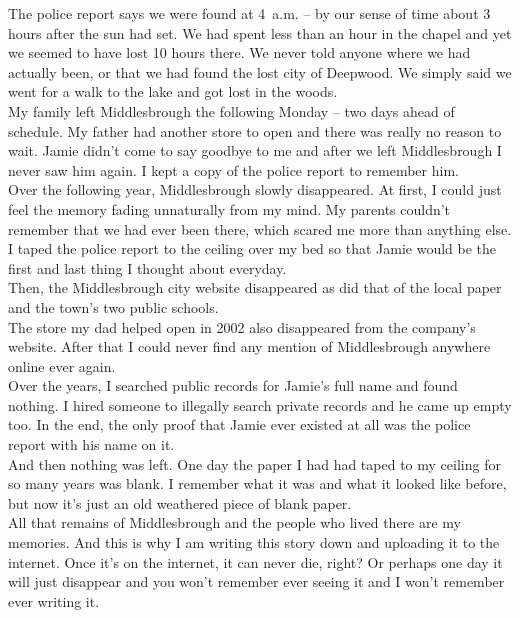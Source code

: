 \documentclass[a5paper]{scrartcl}
\begin{document}
The police report says we were found at 4~a.m. – by our sense of time about 3 hours after the sun had set. We had spent less than an hour in the chapel and yet we seemed to have lost 10 hours there. We never told anyone where we had actually been, or that we had found the lost city of Deepwood. We simply said we went for a walk to the lake and got lost in the woods. \\


My family left Middlesbrough the following Monday – two days ahead of schedule. My father had another store to open and there was really no reason to wait. Jamie didn't come to say goodbye to me and after we left Middlesbrough I never saw him again. I kept a copy of the police report to remember him.\\


Over the following year, Middlesbrough slowly disappeared. At first, I could just feel the memory fading unnaturally from my mind. My parents couldn't remember that we had ever been there, which scared me more than anything else. I taped the police report to the ceiling over my bed so that Jamie would be the first and last thing I thought about everyday.  \\


Then, the Middlesbrough city website disappeared as did that of the local paper and the town's two public schools.\\


The store my dad helped open in 2002 also disappeared from the company's website. After that I could never find any mention of Middlesbrough anywhere online ever again.\\


Over the years, I searched public records for Jamie's full name and found nothing. I hired someone to illegally search private records and he came up empty too. In the end, the only proof that Jamie ever existed at all was the police report with his name on it.\\


And then nothing was left.  One day the paper I had had taped to my ceiling for so many years was blank. I remember what it was and what it looked like before, but now it's just an old weathered piece of blank paper.\\


All that remains of Middlesbrough and the people who lived there are my memories. And this is why I am writing this story down and uploading it to the internet. Once it's on the internet, it can never die, right? Or perhaps one day it will just disappear and you won't remember ever seeing it and I won't remember ever writing it.\\
\end{document}
